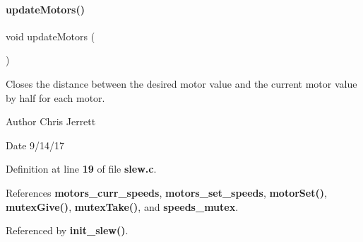 \paragraph{update\+Motors()}
{\footnotesize\ttfamily void update\+Motors (\begin{DoxyParamCaption}{ }\end{DoxyParamCaption})}



Closes the distance between the desired motor value and the current motor value by half for each motor. 

\begin{DoxyAuthor}{Author}
Chris Jerrett 
\end{DoxyAuthor}
\begin{DoxyDate}{Date}
9/14/17 
\end{DoxyDate}


Definition at line \textbf{ 19} of file \textbf{ slew.\+c}.



References \textbf{ motors\+\_\+curr\+\_\+speeds}, \textbf{ motors\+\_\+set\+\_\+speeds}, \textbf{ motor\+Set()}, \textbf{ mutex\+Give()}, \textbf{ mutex\+Take()}, and \textbf{ speeds\+\_\+mutex}.



Referenced by \textbf{ init\+\_\+slew()}.


